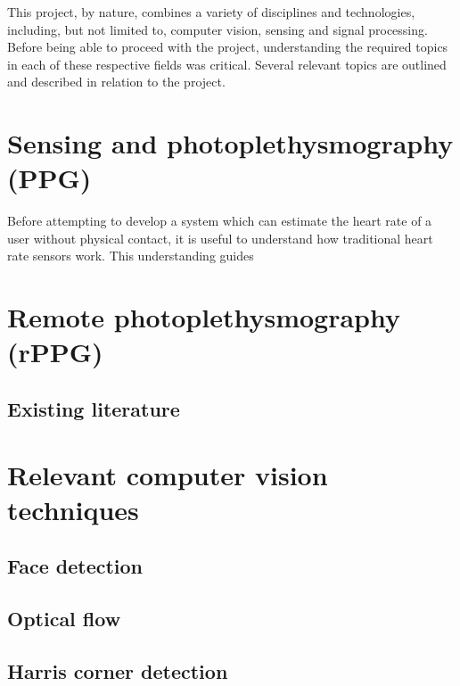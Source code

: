 This project, by nature, combines a variety of disciplines and technologies, including, but not limited to, computer vision, sensing and signal processing. 
Before being able to proceed with the project, understanding the required topics in each of these respective fields was critical. Several relevant topics are outlined 
and described in relation to the project.

\section{Sensing and photoplethysmography (PPG)}
Before attempting to develop a system which can estimate the heart rate of a user without physical contact, it is useful to understand how traditional heart rate sensors work.
This understanding guides

\section{Remote photoplethysmography (rPPG)}
\subsection{Existing literature}
\subsection{}

\section{Relevant computer vision techniques}
\subsection{Face detection}
\subsection{Optical flow}
\subsection{Harris corner detection}
